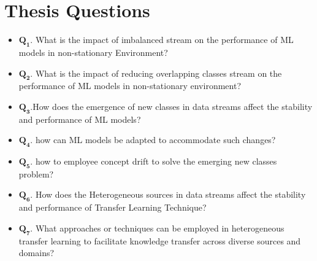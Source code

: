 \section{Thesis Questions}
\label{sec:1_introduction_questions}

\begin{itemize}
    \setlength{\itemindent}{-.5in}
       \item $\pmb{Q_1}$. What is the impact of imbalanced stream on the performance of ML models in non-stationary Environment?
        \item $\pmb{Q_2}$. What is the impact of reducing overlapping classes stream on the performance of ML models in non-stationary environment?
        \item $\pmb{Q_3}$.How does the emergence of new classes in data streams affect the stability and performance of ML models?
        \item $\pmb{Q_4}$. how can ML models be adapted to accommodate such changes?
        \item $\pmb{Q_5}$. how to employee concept drift to solve the emerging new classes problem?
        \item $\pmb{Q_6}$. How does the Heterogeneous sources in data streams affect the stability and performance of Transfer Learning Technique?
        \item $\pmb{Q_7}$. What approaches or techniques can be employed in heterogeneous transfer learning to facilitate knowledge transfer across diverse sources and domains?
    \end{itemize}
    